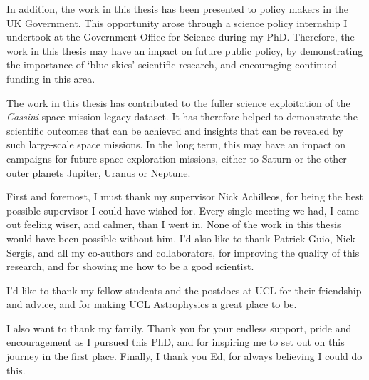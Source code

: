 \begin{impactstatement}
In addition, the work in this thesis has been presented to policy makers in the UK Government. This opportunity arose through a science policy internship I undertook at the Government Office for Science during my PhD. Therefore, the work in this thesis may have an impact on future public policy, by demonstrating the importance of `blue-skies’ scientific research, and encouraging continued funding in this area.

The work in this thesis has contributed to the fuller science exploitation of the \textit{Cassini} space mission legacy dataset. It has therefore helped to demonstrate the scientific outcomes that can be achieved and insights that can be revealed by such large-scale space missions. In the long term, this may have an impact on campaigns for future space exploration missions, either to Saturn or the other outer planets Jupiter, Uranus or Neptune.

\end{impactstatement}

\begin{acknowledgements}
First and foremost, I must thank my supervisor Nick Achilleos, for being the best possible supervisor I could have wished for. Every single meeting we had, I came out feeling wiser, and calmer, than I went in. None of the work in this thesis would have been possible without him. I'd also like to thank Patrick Guio, Nick Sergis, and all my co-authors and collaborators, for improving the quality of this research, and for showing me how to be a good scientist.

I'd like to thank my fellow students and the postdocs at UCL for their friendship and advice, and for making UCL Astrophysics a great place to  be.

I also want to thank my family. Thank you for your endless support, pride and encouragement as I pursued this PhD, and for inspiring me to set out on this journey in the first place. Finally, I thank you Ed, for always believing I could do this.
\end{acknowledgements}

\setcounter{tocdepth}{2} 

\tableofcontents

\cleardoublepage %
{}

\listoffigures

\cleardoublepage %
{}

\listoftables

